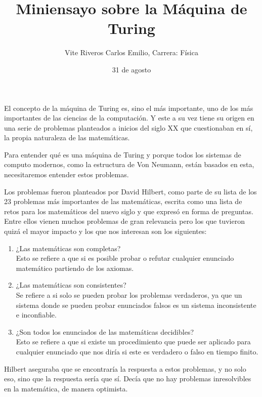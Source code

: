 \documentclass{article}
\title{Miniensayo sobre la Máquina de Turing}
\author{Vite Riveros Carlos Emilio, Carrera: Física}
\date{31 de agosto}
\begin{document}
    \maketitle

    El concepto de la máquina de Turing es, sino el más importante, uno de los más importantes de 
    las ciencias de la computación. Y este a su vez tiene su origen en una serie de problemas
    planteados a inicios del siglo XX que cuestionaban en sí, la propia naturaleza de las matemáticas. 
    

    Para entender qué es una máquina de Turing y porque todos los sistemas de computo modernos, 
    como la estructura de Von Neumann, están basados en esta, necesitaremos entender estos problemas.


    Los problemas fueron planteados por David Hilbert, como parte de su lista de los 23 problemas más 
    importantes de las matemáticas, escrita como una lista de retos para los matemáticos del nuevo siglo
    y que expresó en forma de preguntas. Entre ellos vienen muchos problemas de gran relevancia pero los que 
    tuvieron quizá el mayor impacto y los que nos interesan son los siguientes:

    \begin{enumerate}
        \centering
        \item ¿Las matemáticas son completas?\\
        Esto se refiere a que si es posible probar o refutar cualquier enunciado matemático partiendo de 
        los axiomas.
    
        \item ¿Las matemáticas son consistentes?\\
        Se refiere a si solo se pueden probar los problemas verdaderos, ya que un sistema donde se pueden 
        probar enunciados falsos es un sistema inconsistente e inconfiable.

        \item ¿Son todos los enunciados de las matemáticas decidibles?\\
        Esto se refiere a que si existe un procedimiento que puede ser aplicado para cualquier enunciado que 
        nos diría si este es verdadero o falso en tiempo finito.
    \end{enumerate}
    
    Hilbert aseguraba que se encontraría la respuesta a estos problemas, y no solo eso, sino que la respuesta sería
    que sí. Decía que no hay problemas inresolvibles en la matemática, de manera optimista.
\end{document}

